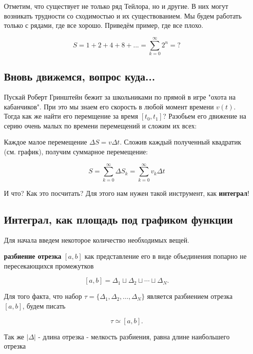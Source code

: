 Отметим, что существует не только ряд Тейлора, но и другие. В них могут возникать трудности со сходимостью и их существованием. Мы будем работать только с рядами, где все хорошо. Приведём пример, где все плохо.

\begin{equation*}
        S = 1 + 2 + 4 + 8 + ... = \sum_{k = 0}^{\infty} 2^n = ?
\end{equation*}

\subsection{Вновь движемся, вопрос куда...}
Пускай Роберт Гринштейн бежит за школьниками по прямой в игре "охота на кабанчиков". При это мы знаем его скорость в любой момент времени $v(t)$. Тогда как же найти его перемщение за время $[t_0, t_1]$? Разобьем его движение на серию очень малых по времени перемещений и сложим их всех:


Каждое малое перемещение $\Delta S =v \Delta t$. Сложив каждый полученный квадратик (см. график), получим суммарное перемещение:

\begin{equation*}
        S = \sum_{k = 0}^{\infty} \Delta S_k = \sum_{k = 0}^{\infty} v_k \Delta t
\end{equation*}

И что? Как это посчитать? Для этого нам нужен такой инструмент, как \textbf{интеграл}!

\subsection{Интеграл, как площадь под графиком функции}
Для начала введем некоторое количество необходимых вещей.

\begin{definition}
\textbf{разбиение отрезка} $[a, b]$ как представление его в виде объединения попарно не пересекающихся промежутков

\[
[a, b] = \Delta_1 \sqcup \Delta_2 \sqcup \cdots \sqcup \Delta_N.
\]

Для того факта, что набор $\tau = \{\Delta_1, \Delta_2, \ldots, \Delta_N\}$ является разбиением отрезка $[a, b]$, будем писать

\[
\tau \simeq [a, b].
\]

Так же $|\Delta| $ - длина отрезка - мелкость разбиения, равна длине наибольшего отрезка

\end{definition}



